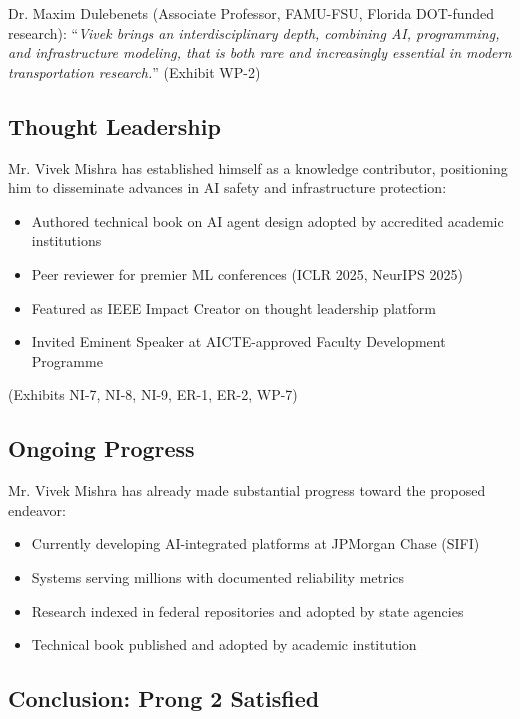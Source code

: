 \documentclass[11pt]{article}
\newcommand{\say}[1]{``#1''}
\newcommand{\dr}{Mr. Vivek Mishra }
\newcommand{\qu}[1]{\say{\emph{#1}}}
\begin{document}
Dr. Maxim Dulebenets (Associate Professor, FAMU-FSU, Florida DOT-funded research): \qu{Vivek brings an interdisciplinary depth, combining AI, programming, and infrastructure modeling, that is both rare and increasingly essential in modern transportation research.} (Exhibit WP-2)

\subsection{Thought Leadership}

\dr has established himself as a knowledge contributor, positioning him to disseminate advances in AI safety and infrastructure protection:

\begin{itemize}
    \item Authored technical book on AI agent design adopted by accredited academic institutions
    \item Peer reviewer for premier ML conferences (ICLR 2025, NeurIPS 2025)
    \item Featured as IEEE Impact Creator on thought leadership platform
    \item Invited Eminent Speaker at AICTE-approved Faculty Development Programme
\end{itemize}

(Exhibits NI-7, NI-8, NI-9, ER-1, ER-2, WP-7)

\subsection{Ongoing Progress}

\dr has already made substantial progress toward the proposed endeavor:

\begin{itemize}
    \item[$\checkmark$] Currently developing AI-integrated platforms at JPMorgan Chase (SIFI)
    \item[$\checkmark$] Systems serving millions with documented reliability metrics
    \item[$\checkmark$] Research indexed in federal repositories and adopted by state agencies
    \item[$\checkmark$] Technical book published and adopted by academic institution
\end{itemize}

\subsection{Conclusion: Prong 2 Satisfied}
\end{document}
